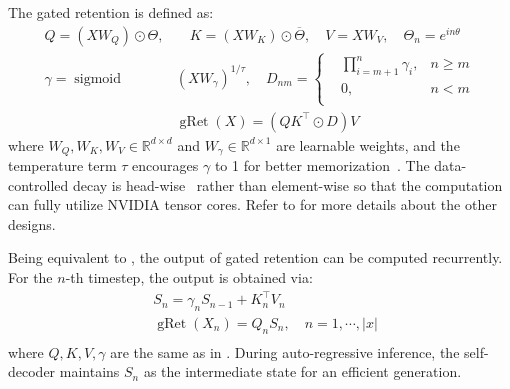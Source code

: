 The gated retention is defined as:
\begin{equation}
\begin{aligned}
Q = (X W_Q) \odot \Theta ,& \quad K = (X W_K) \odot \overline{\Theta} ,\quad V = X W_V ,\quad \Theta_n = e^{in\theta} \\
\gamma = \operatorname{sigmoid} &(X W_{\gamma})^{1/\tau} , \quad D_{nm} =
\left\{
\begin{aligned}
& \prod_{i=m+1}^{n}\gamma_i, &n\ge m \\
& 0, &n < m \\
\end{aligned}
\right. \\
&\operatorname{gRet}(X) = (Q K^\intercal \odot D)V
\label{eq:gret:parallel}
\end{aligned}
\end{equation}
where $W_Q, W_K, W_V \in \mathbb{R}^{d\times d}$ and $W_{\gamma} \in \mathbb{R}^{d\times 1}$ are learnable weights, and the temperature term $\tau$ encourages $\gamma$ to 1 for better memorization~\cite{gla}.
The data-controlled decay is head-wise~\cite{gateloop} rather than element-wise so that the computation can fully utilize NVIDIA tensor cores.
Refer to \cite{retnet} for more details about the other designs.

Being equivalent to , the output of gated retention can be computed recurrently.
For the $n$-th timestep, the output is obtained via:
\begin{equation}
\begin{aligned}
&S_n = \gamma_n S_{n-1} + K_n^{\intercal} V_n \\
&\operatorname{gRet}(X_n) = Q_n S_n, \quad n = 1, \cdots, |x| \\
\label{eq:gret:recurrent}
\end{aligned}
\end{equation}
where $Q, K, V, \gamma$ are the same as in .
During auto-regressive inference, the self-decoder maintains $S_n$ as the intermediate state for an efficient generation.

